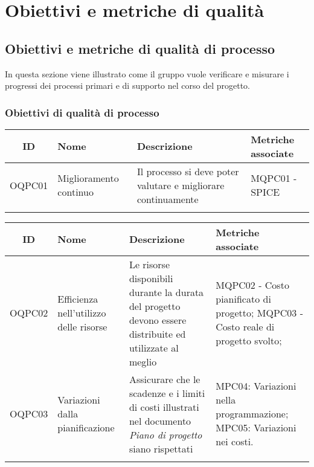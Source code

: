 \section{Obiettivi e metriche di qualità}
\subsection{Obiettivi e metriche di qualità di processo}
In questa sezione viene illustrato come il gruppo vuole verificare e misurare i progressi dei processi primari e di supporto nel corso del progetto. 
\subsubsection{Obiettivi di qualità di processo}
\begin{center}
	\setlength\extrarowheight{5pt}
	\begin{tabularx}{\textwidth}{|c|X|X|X|}
	\hline
	\rowcolor{white}
	\textbf{ID} & \textbf{Nome} & \textbf{Descrizione} & \textbf{Metriche associate}\\
	\hline
	OQPC01 & Miglioramento continuo & Il processo si deve poter valutare e migliorare continuamente & MQPC01 - SPICE\\
	\hline
	\rowcolor{white}
	\caption{Obiettivi di qualità di gestione di processo}
	\end{tabularx}
\end{center}
\begin{center}
	\setlength\extrarowheight{5pt}
	\begin{tabularx}{\textwidth}{|c|X|X|X|}
		\hline
		\rowcolor{white}
		\textbf{ID} & \textbf{Nome} & \textbf{Descrizione} & \textbf{Metriche associate}\\
		\hline
		OQPC02 & Efficienza nell'utilizzo delle risorse & Le risorse disponibili durante la durata del progetto devono essere distribuite ed utilizzate al meglio & MQPC02 - Costo pianificato di progetto; MQPC03 - Costo reale di progetto svolto;\\
		\hline
		OQPC03 & Variazioni dalla pianificazione & Assicurare che le scadenze e i limiti di costi illustrati nel documento \textit{Piano di progetto} siano rispettati &  MPC04: Variazioni nella programmazione;\hspace{65pt} MPC05: Variazioni nei costi. \\
		\hline
		\rowcolor{white}
		\caption{Obiettivi di qualità di processo di pianificazione}
	\end{tabularx}
\end{center}
